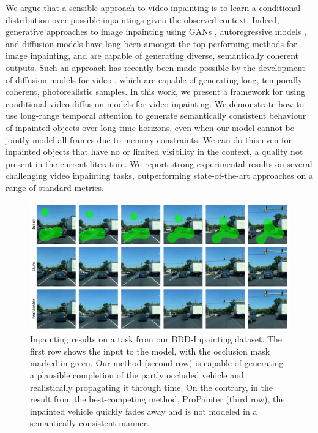  
We argue that a sensible approach to video inpainting is to learn a conditional distribution over possible inpaintings given the observed context. Indeed, generative approaches to image inpainting using GANs \cite{imin3, imin4, imin5}, autoregressive models \cite{imin1}, and diffusion models \cite{palette, repaint} have long been amongst the top performing methods for image inpainting, and are capable of generating diverse, semantically coherent outputs. Such an approach has recently been made possible by the development of diffusion models for video \cite{didrik, fdm, vdm, yang2022diffusion, voleti2022MCVD}, which are capable of generating long, temporally coherent, photorealistic samples. In this work, we present a framework for using conditional video diffusion models for video inpainting. We demonstrate how to use long-range temporal attention to generate semantically consistent behaviour of inpainted objects over long time horizons, even when our model cannot be jointly model all frames due to memory constraints. We can do this even for inpainted objects that have no or limited visibility in the context, a quality not present in the current literature. We report strong experimental results on several challenging video inpainting tasks, outperforming state-of-the-art approaches on a range of standard metrics.

\begin{figure}[h!]
    \centering
    \includegraphics[width=\textwidth]{figures/bddv2.pdf}
    \caption{Inpainting results on a task from our BDD-Inpainting dataset. The first row shows the input to the model, with the occlusion mask marked in green. Our method (second row) is capable of generating a plausible completion of the partly occluded vehicle and realistically propagating it through time. On the contrary, in the result from the best-competing method, ProPainter \cite{propainter} (third row), the inpainted vehicle quickly fades away and is not modeled in a semantically consistent manner.}
    \label{fig:fig1}
\end{figure}


